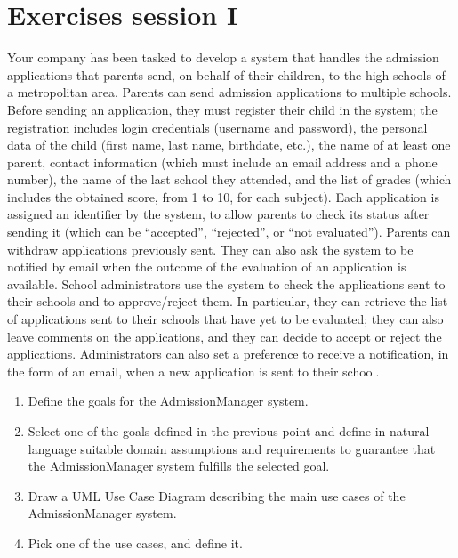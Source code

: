 \documentclass[12pt, a4paper]{report}
\newtheorem[style=M,bodystyle=\normalfont]{theorem}{Theorem}
\newtheorem[style=M,bodystyle=\normalfont]{corollary}{Corollary}
\newtheorem[style=M,bodystyle=\normalfont]{lemma}{Lemma}
\newtheorem[style=M,bodystyle=\normalfont]{definition}{Definition}
\begin{document}
\chapter{Exercises session I}
    \begin{Exercise}[label=1]
        Your company has been tasked to develop a system that handles the admission applications that parents send, on behalf of their children, to the high schools of a metropolitan
        area. Parents can send admission applications to multiple schools. Before sending an application, they must register their child in the system; the registration includes 
        login credentials (username and password), the personal data of the child (first name, last name, birthdate, etc.), the name of at least one parent, contact information 
        (which must include an email address and a phone number), the name of the last school they attended, and the list of grades (which includes the obtained score, from 1 to 10, 
        for each subject). Each application is assigned an identifier by the system, to allow parents to check its status after sending it (which can be “accepted”, “rejected”, or 
        “not evaluated”). Parents can withdraw applications previously sent. They can also ask the system to be notified by email when the outcome of the evaluation of an application
        is available. School administrators use the system to check the applications sent to their schools and to approve/reject them. In particular, they can retrieve the list of 
        applications sent to their schools that have yet to be evaluated; they can also leave comments on the applications, and they can decide to accept or reject the applications.
        Administrators can also set a preference to receive a notification, in the form of an email, when a new application is sent to their school.
        \begin{enumerate}
            \item Define the goals for the AdmissionManager system.
            \item Select one of the goals defined in the previous point and define in natural language suitable domain assumptions and requirements to guarantee that the 
                AdmissionManager system fulfills the selected goal.
            \item Draw a UML Use Case Diagram describing the main use cases of the AdmissionManager system.
            \item Pick one of the use cases, and define it. 
        \end{enumerate}
    \end{Exercise}
\end{document}
